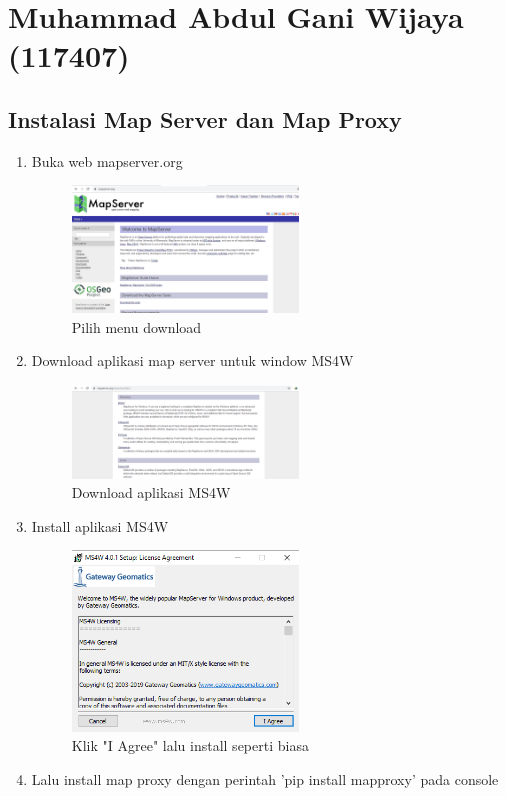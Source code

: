 \section{Muhammad Abdul Gani Wijaya (117407)}
\subsection{Instalasi Map Server dan Map Proxy}
\begin{enumerate}
	\item Buka web mapserver.org
		\begin{figure}[H]
			\includegraphics[width=6cm]{figures/Tugas4/1174071/1.png}
			\centering
			\caption{Pilih menu download}
		\end{figure}
	\item Download aplikasi map server untuk window MS4W
		\begin{figure}[H]
			\includegraphics[width=6cm]{figures/Tugas4/1174071/2.png}
			\centering
			\caption{Download aplikasi MS4W}
		\end{figure}
	\item Install aplikasi MS4W
		\begin{figure}[H]
			\includegraphics[width=6cm]{figures/Tugas4/1174071/3.png}
			\centering
			\caption{Klik "I Agree" lalu install seperti biasa}
		\end{figure}
	\item Lalu install map proxy dengan perintah 'pip install mapproxy' pada console

\end{enumerate}
